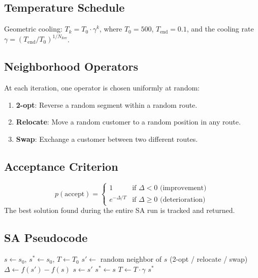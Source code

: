 \documentclass[12pt,a4paper]{article}
\begin{document}
\subsection{Temperature Schedule}
Geometric cooling: $T_k = T_0 \cdot \gamma^k$, where $T_0 = 500$, $T_{\text{end}} = 0.1$, and the cooling rate $\gamma = (T_{\text{end}}/T_0)^{1/N_{\text{iter}}}$.

\subsection{Neighborhood Operators}
At each iteration, one operator is chosen uniformly at random:
\begin{enumerate}[nosep]
  \item \textbf{2-opt}: Reverse a random segment within a random route.
  \item \textbf{Relocate}: Move a random customer to a random position in any route.
  \item \textbf{Swap}: Exchange a customer between two different routes.
\end{enumerate}

\subsection{Acceptance Criterion}
\begin{equation}
p(\text{accept}) = \begin{cases}
  1 & \text{if } \Delta < 0 \text{ (improvement)} \\
  e^{-\Delta / T} & \text{if } \Delta \geq 0 \text{ (deterioration)}
\end{cases}
\end{equation}
The best solution found during the entire SA run is tracked and returned.

\subsection{SA Pseudocode}
\begin{algorithm}[H]
\caption{Simulated Annealing}
\begin{algorithmic}[1]
\STATE $s \leftarrow s_0$, $s^* \leftarrow s_0$, $T \leftarrow T_0$
  \STATE $s' \leftarrow$ random neighbor of $s$ (2-opt / relocate / swap)
  \STATE $\Delta \leftarrow f(s') - f(s)$
    \STATE $s \leftarrow s'$
      \STATE $s^* \leftarrow s$
    \ENDIF
  \ENDIF
  \STATE $T \leftarrow T \cdot \gamma$
\ENDFOR
\RETURN $s^*$
\end{algorithmic}
\end{algorithm}
\end{document}
